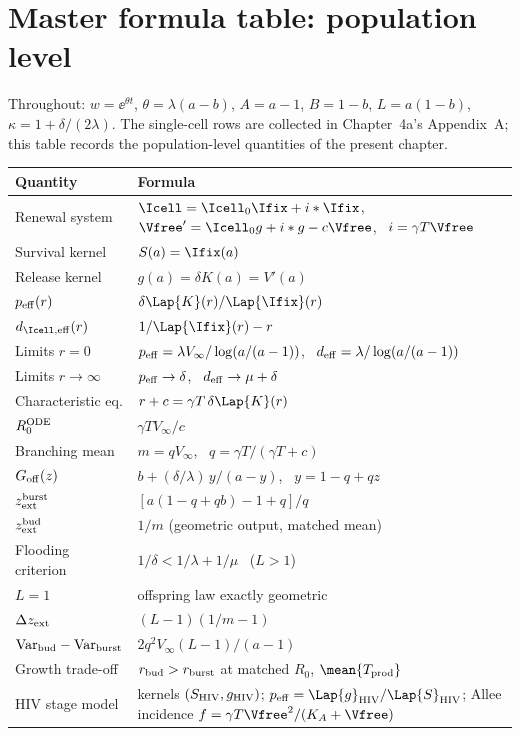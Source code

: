 
\section{Master formula table: population level}
\label{app:formula-tables}

Throughout: $w=\ee^{\theta t}$, $\theta=\lambda(a-b)$, $A=a-1$, $B=1-b$,
$L=a(1-b)$, $\kappa=1+\delta/(2\lambda)$. The single-cell rows are
collected in Chapter~4a's Appendix~A; this table records the
population-level quantities of the present chapter.

\begin{center}
\renewcommand{\arraystretch}{1.3}
\small
\begin{tabular}{@{}p{}p{}@{}}
\toprule
Quantity & Formula \\
\midrule
Renewal system & $\Icell=\Icell_0\Ifix+i*\Ifix$, \ $\Vfree'=\Icell_0 g+i*g-c\Vfree$, \ $i=\gamma T\Vfree$ \\
Survival kernel & $S(a)=\Ifix(a)$ \\
Release kernel & $g(a)=\delta K(a)=V'(a)$ \\
$p_{\rm eff}(r)$ & $\delta\Lap{K}(r)/\Lap{\Ifix}(r)$ \\
$d_{\Icell,{\rm eff}}(r)$ & $1/\Lap{\Ifix}(r)-r$ \\
Limits $r=0$ & $p_{\rm eff}=\lambda V_\infty/\log(a/(a-1))$, \ $d_{\rm eff}=\lambda/\log(a/(a-1))$ \\
Limits $r\to\infty$ & $p_{\rm eff}\to\delta$, \ $d_{\rm eff}\to\mu+\delta$ \\
Characteristic eq. & $r+c=\gamma T\,\delta\Lap{K}(r)$ \\
$R_0^{\rm ODE}$ & $\gamma T V_\infty/c$ \\
Branching mean & $m=qV_\infty$, \ $q=\gamma T/(\gamma T+c)$ \\
$G_{\rm off}(z)$ & $b+(\delta/\lambda)\,y/(a-y)$, \ $y=1-q+qz$ \\
$z_{\rm ext}^{\rm burst}$ & $[a(1-q+qb)-1+q]/q$ \\
$z_{\rm ext}^{\rm bud}$ & $1/m$ (geometric output, matched mean) \\
Flooding criterion & $1/\delta<1/\lambda+1/\mu$ \ ($L>1$) \\
$L=1$ & offspring law exactly geometric \\
$\Delta z_{\rm ext}$ & $(L-1)(1/m-1)$ \\
$\mathrm{Var}_{\rm bud}-\mathrm{Var}_{\rm burst}$ & $2q^2V_\infty(L-1)/(a-1)$ \\
Growth trade-off & $r_{\rm bud}>r_{\rm burst}$ at matched $R_0$, $\mean{T_{\rm prod}}$ \\
HIV stage model & kernels $(S_{\rm HIV},g_{\rm HIV})$; $p_{\rm eff}=\Lap{g}_{\rm HIV}/\Lap{S}_{\rm HIV}$; Allee incidence $f=\gamma T\Vfree^2/(K_A+\Vfree)$ \\
\bottomrule
\end{tabular}
\end{center}

